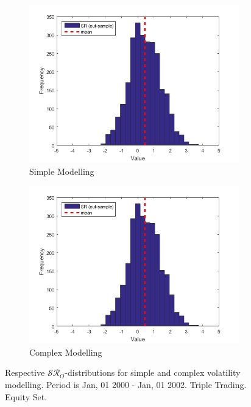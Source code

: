 \documentclass[11pt,a4,twosided,singlespacing,titlepagenumber=on]{scrreprt}
\numberwithin{equation}{chapter} %
\theoremstyle{remark}
\begin{document}
\begin{figure}[H]
    \centering
    \begin{subfigure}[t]{0.49\textwidth}
        \centering
        \includegraphics[width=1\textwidth]{res/params/3653_4384/sr}
        \caption{Simple Modelling}
    \end{subfigure}
    \begin{subfigure}[t]{0.49\textwidth}
        \centering
        \includegraphics[width=1\textwidth]{res/params/3653_4384/sr}
        \caption{Complex Modelling}
    \end{subfigure}
    \caption[]{Respective $\mathcal{SR}_O$-distributions for simple and complex volatility modelling. Period is Jan, 01 2000 - Jan, 01 2002. Triple Trading. Equity Set.}
    \label{fig:sharpe_ratio_comparison}
\end{figure}
\end{document}

